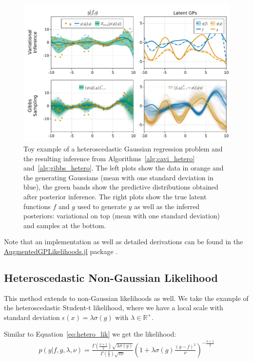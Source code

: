 \begin{figure}
\includegraphics[width=\textwidth]{./chapters/8_discussions/figures/heteroscedastic.pdf}
\caption{Toy example of a heteroscedastic Gaussian regression problem and the resulting inference from Algorithms~\ref{alg:cavi_hetero} and~\ref{alg:gibbs_hetero}.
The left plots show the data in orange and the generating Gaussians (mean with one standard deviation in blue), the green bands show the predictive distributions obtained after posterior inference.
The right plots show the true latent functions $f$ and $g$ used to generate $y$ as well as the inferred posteriors: variational on top (mean with one standard deviation) and samples at the bottom.}
\label{fig:heteroscedastic}
\end{figure}

Note that an implementation as well as detailed derivations can be found in the \href{https://github.com/JuliaGaussianProcesses/AugmentedGPLikelihoods.jl}{AugmentedGPLikelihoods.jl} package \cite{theo_galy_fajou_2022_6347022}.

\subsection{Heteroscedastic Non-Gaussian Likelihood}

This method extends to non-Gaussian likelihoods as well.
We take the example of the heteroscedastic Student-t likelihood, where we have a local scale with standard deviation $\epsilon(x) = \lambda \sigma(g)$ with $\lambda \in \mathbb{R}^+$.

Similar to Equation~\eqref{eq:hetero_lik} we get the likelihood:
\begin{align*}
    p(y|f,g,\lambda,\nu) = \frac{\Gamma(\frac{\nu+1}{2})\sqrt{\lambda\sigma(g)}}{\Gamma(\frac{\nu}{2})\sqrt{\pi\nu}}\left(1 + \lambda \sigma(g)\frac{(y-f)^2}{\nu}\right)^{-\frac{\nu+1}{2}}
    \label{eq:hetero_studentt}
\end{align*}

